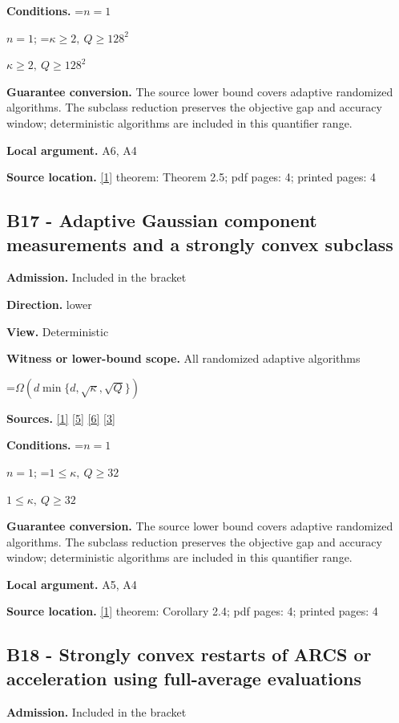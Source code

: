 \documentclass[10pt,a4paper]{article}
\newcommand{\AtlasMath}[1]{\par\begingroup\centering\setbox0=\hbox{$\displaystyle #1$}\ifdim\wd0>1.4\linewidth\typeout{ATLAS WIDE FORMULA: \the\wd0}\fi\ifdim\wd0>\linewidth\resizebox{\linewidth}{!}{\box0}\else\box0\fi\par\endgroup}
\newcommand{\AtlasInlineMath}[1]{\begingroup\setbox0=\hbox{$#1$}\ifdim\wd0>.4\linewidth\endgroup\AtlasMath{#1}\else\endgroup$#1$\fi}
\begin{document}
\textbf{Conditions.} \AtlasInlineMath{n=1}; \AtlasInlineMath{\kappa\ge2,\ Q\ge128^2}

\textbf{Guarantee conversion.} The source lower bound covers adaptive randomized algorithms. The subclass reduction preserves the objective gap and accuracy window; deterministic algorithms are included in this quantifier range.

\textbf{Local argument.} A6, A4

\textbf{Source location.} \href{https://arxiv.org/html/2610.00345v1}{[1]} theorem: Theorem 2.5; pdf pages: 4; printed pages: 4

\subsection{B17 - Adaptive Gaussian component measurements and a strongly convex subclass}
\textbf{Admission.} Included in the bracket

\textbf{Direction.} lower

\textbf{View.} Deterministic

\textbf{Witness or lower-bound scope.} All randomized adaptive algorithms

\AtlasMath{\Omega(d\min\{d,\sqrt\kappa,\sqrt Q\})}
\textbf{Sources.} \href{https://arxiv.org/html/2610.00345v1}{[1]} \href{https://arxiv.org/html/2607.16558v2}{[5]} \href{https://www.mathnet.ru/php/archive.phtml?jrnid=mzm&option_lang=eng&paperid=1697&wshow=paper}{[6]} \href{https://arxiv.org/abs/2109.08858}{[3]}

\textbf{Conditions.} \AtlasInlineMath{n=1}; \AtlasInlineMath{1\le\kappa,\ Q\ge32}

\textbf{Guarantee conversion.} The source lower bound covers adaptive randomized algorithms. The subclass reduction preserves the objective gap and accuracy window; deterministic algorithms are included in this quantifier range.

\textbf{Local argument.} A5, A4

\textbf{Source location.} \href{https://arxiv.org/html/2610.00345v1}{[1]} theorem: Corollary 2.4; pdf pages: 4; printed pages: 4

\subsection{B18 - Strongly convex restarts of ARCS or acceleration using full-average evaluations}
\textbf{Admission.} Included in the bracket
\end{document}
